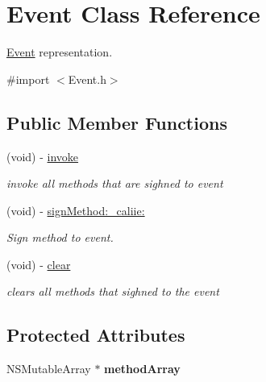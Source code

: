 \hypertarget{interface_event}{
\section{\-Event \-Class \-Reference}
\label{interface_event}
}


\hyperlink{interface_event}{\-Event} representation.  




{\ttfamily \#import $<$\-Event.\-h$>$}

\subsection*{\-Public \-Member \-Functions}
\begin{DoxyCompactItemize}
\item 
\hypertarget{interface_event_a1a7f5c65af911dd09b7f31f5dd33ffcc}{
(void) -\/ \hyperlink{interface_event_a1a7f5c65af911dd09b7f31f5dd33ffcc}{invoke}}
\label{interface_event_a1a7f5c65af911dd09b7f31f5dd33ffcc}

\begin{DoxyCompactList}\small\item\em invoke all methods that are sighned to event \end{DoxyCompactList}\item 
(void) -\/ \hyperlink{interface_event_a9783d0c73f5e3f7265bb6026dc69397f}{sign\-Method\-:\-\_\-caliie\-:}
\begin{DoxyCompactList}\small\item\em \-Sign method to event. \end{DoxyCompactList}\item 
\hypertarget{interface_event_a0862af1471604bf30a4f50a5e028637a}{
(void) -\/ \hyperlink{interface_event_a0862af1471604bf30a4f50a5e028637a}{clear}}
\label{interface_event_a0862af1471604bf30a4f50a5e028637a}

\begin{DoxyCompactList}\small\item\em clears all methods that sighned to the event \end{DoxyCompactList}\end{DoxyCompactItemize}
\subsection*{\-Protected \-Attributes}
\begin{DoxyCompactItemize}
\item 
\hypertarget{interface_event_a1b84ad54cd4697904c6868fe7dae92b2}{
\-N\-S\-Mutable\-Array $\ast$ {\bfseries method\-Array}}
\label{interface_event_a1b84ad54cd4697904c6868fe7dae92b2}

\end{DoxyCompactItemize}



